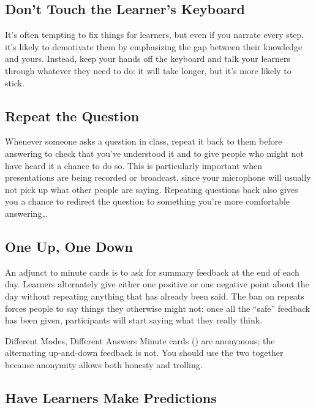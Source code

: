 \subsection*{Don't Touch the Learner's Keyboard}

It's often tempting to fix things for learners,
but even if you narrate every step,
it's likely to demotivate them
by emphasizing the gap between their knowledge and yours.
Instead,
keep your hands off the keyboard and talk your learners through whatever they need to do:
it will take longer,
but it's more likely to stick.

\subsection*{Repeat the Question}

Whenever someone asks a question in class,
repeat it back to them before answering
to check that you've understood it
and to give people who might not have heard it a chance to do so.
This is particularly important when presentations are being recorded or broadcast,
since your microphone will usually not pick up what other people are saying.
Repeating questions back also gives you a chance
to redirect the question to something you're more comfortable answering{\ldots}

\subsection*{One Up, One Down}

An adjunct to minute cards is to ask for summary feedback at the end of each day.
Learners alternately give either one positive or one negative point about the day
without repeating anything that has already been said.
The ban on repeats forces people to say things they otherwise might not:
once all the ``safe'' feedback has been given,
participants will start saying what they really think.

\begin{aside}{Different Modes, Different Answers}
  Minute cards () are anonymous;
  the alternating up-and-down feedback is not.
  You should use the two together
  because anonymity allows both honesty and trolling.
\end{aside}

\subsection*{Have Learners Make Predictions}

